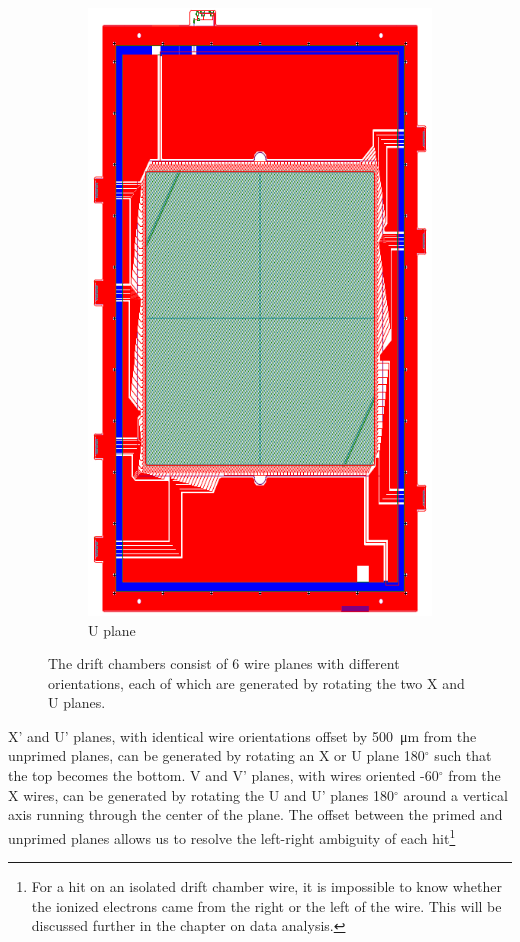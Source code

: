 \begin{figure}[h]
\begin{subfigure}[b]{0.4\textwidth}
        \includegraphics[width=\textwidth]{chap3/shms_dc_u_plane.png}
        \caption{U plane}
        \label{fig:dc_u_plane}
    \end{subfigure}
    \caption{The drift chambers consist of 6 wire planes with different
             orientations, each of which are generated by rotating the two
             X and U planes.}
    \label{fig:dc_planes}
\end{figure}

X' and U' planes, with identical wire orientations offset by
\SI{500}{\micro\meter} from the unprimed planes, can be generated by rotating
an X or U plane 180$^\circ$ such that the top becomes the bottom.
V and V' planes, with wires oriented -60$^\circ$ from the X wires, can be
generated by rotating the U and U' planes 180$^\circ$ around a vertical axis
running through the center of the plane.
The offset between the primed and unprimed planes allows us to resolve the
left-right ambiguity of each hit\footnote{For a hit on an isolated drift
chamber wire, it is impossible to know whether the ionized electrons came from
the right or the left of the wire. This will be discussed further in the
chapter on data analysis.}


